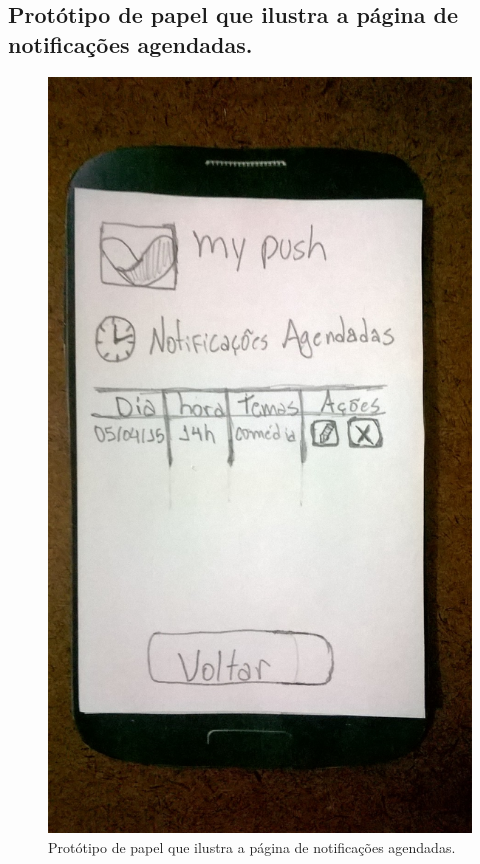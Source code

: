 \begin{apendicesenv}
    \pagebreak
    \section*{Protótipo de papel que ilustra a página de notificações agendadas.}
    
      \begin{figure}[!htbp]
	\centering
	\includegraphics[scale=0.32, angle=-90]{editaveis/figuras/prototipo_papel_v1/notificacoes_agendadas}
	\caption{Protótipo de papel que ilustra a página de notificações agendadas.}
	\label{notificacoes_agendadas_v1}
      \end{figure}
    

\end{apendicesenv}
